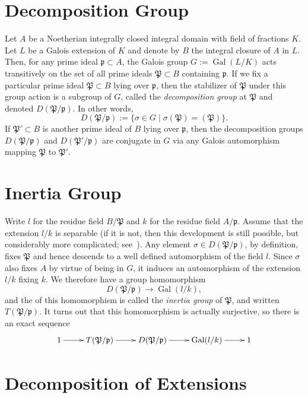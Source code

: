 \documentclass[12pt]{article}
\newcommand{\p}{{\mathfrak{p}}}
\renewcommand{\P}{{\mathfrak{P}}}
\newcommand{\lra}{\longrightarrow}
\newcommand{\Gal}{\operatorname{Gal}}
\begin{document}
\section{Decomposition Group}

Let $A$ be a Noetherian integrally closed integral domain with field
of fractions $K$. Let $L$ be a Galois extension of $K$ and denote by
$B$ the integral closure of $A$ in $L$. Then, for any prime ideal $\p
\subset A$, the Galois group $G := \Gal(L/K)$ acts transitively on the
set of all prime ideals $\P \subset B$ containing $\p$. If we fix a
particular prime ideal $\P \subset B$ lying over $\p$, then the
stabilizer of $\P$ under this group action is a subgroup of
$G$, called the {\em decomposition group} at $\P$ and denoted
$D(\P/\p)$. In other words,
$$
D(\P/\p) := \{\sigma \in G \mid \sigma(\P) = (\P)\}.
$$
If $\P' \subset B$ is another prime ideal of $B$ lying over $\p$, then
the decomposition groups $D(\P/\p)$ and $D(\P'/\p)$ are conjugate in
$G$ via any Galois automorphism mapping $\P$ to $\P'$.

\section{Inertia Group}

Write $l$ for the residue field $B/\P$ and $k$ for the residue field
$A/\p$. Assume that the extension $l/k$ is separable (if it is not,
then this development is still possible, but considerably more
complicated; see~\cite[p. 20]{serre}). Any element $\sigma \in
D(\P/\p)$, by definition, fixes $\P$ and hence descends to a well
defined automorphism of the field $l$. Since $\sigma$ also fixes $A$
by virtue of being in $G$, it induces an automorphism of the extension
$l/k$ fixing $k$. We therefore have a group homomorphism
$$
D(\P/\p) \lra \Gal(l/k),
$$
and the  of this homomorphism is called the {\em inertia group} of
$\P$, and written $T(\P/\p)$. It turns out that this homomorphism is
actually surjective, so there is an exact sequence
\begin{equation}\label{exact}
\xymatrix{
1 \ar[r] & T(\P/\p) \ar[r] & D(\P/\p) \ar[r] & \Gal(l/k) \ar[r] & 1
}
\end{equation}

\section{Decomposition of Extensions}
\end{document}
